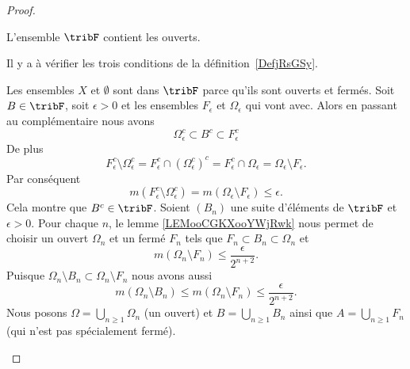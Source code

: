 \begin{proof}
\begin{subproof}
		L'ensemble \( \tribF\) contient les ouverts.

		Il y a à vérifier les trois conditions de la définition~\ref{DefjRsGSy}.
		\begin{subproof}
			Les ensembles \( X\) et \( \emptyset\) sont dans \( \tribF\) parce qu'ils sont ouverts et fermés.
			\spitem[Complémentaire]
			Soit \( B\in \tribF\), soit \( \epsilon>0\) et les ensembles \( F_{\epsilon} \) et \( \Omega_{\epsilon}\) qui vont avec. Alors en passant au complémentaire nous avons
			\begin{equation}
				\Omega_{\epsilon}^c\subset B^c\subset F_{\epsilon}^c
			\end{equation}
			De plus
			\begin{equation}
				F_{\epsilon}^c\setminus \Omega_{\epsilon}^c=F_{\epsilon}^c\cap(\Omega_{\epsilon}^c)^c=F_{\epsilon}^c\cap \Omega_{\epsilon}=\Omega_{\epsilon}\setminus F_{\epsilon}.
			\end{equation}
			Par conséquent
			\begin{equation}
				m(F_{\epsilon}^c\setminus \Omega_{\epsilon}^c)=m(\Omega_{\epsilon}\setminus F_{\epsilon})\leq \epsilon.
			\end{equation}
			Cela montre que \( B^c\in \tribF\).
			Soient \( (B_n)\) une suite d'éléments de \( \tribF\) et \( \epsilon>0\). Pour chaque \( n\), le lemme \ref{LEMooCGKXooYWjRwk} nous permet de choisir un ouvert \( \Omega_n\) et un fermé \( F_n\) tels que \( F_n\subset  B_n\subset \Omega_n\) et
			\begin{equation}
				m(\Omega_n\setminus F_n)\leq \frac{ \epsilon }{ 2^{n+2} }.
			\end{equation}
			Puisque \( \Omega_n\setminus B_n\subset \Omega_n\setminus F_n\) nous avons aussi
			\begin{equation}
				m(\Omega_n\setminus B_n)\leq m(\Omega_n\setminus F_n)\leq \frac{ \epsilon }{ 2^{n+2} }.
			\end{equation}
			Nous posons \( \Omega=\bigcup_{n\geq 1}\Omega_n\) (un ouvert) et \( B=\bigcup_{n\geq 1}B_n\) ainsi que \( A=\bigcup_{n\geq 1}F_n\) (qui n'est pas spécialement fermé).


\end{subproof}
\end{subproof}
\end{proof}
